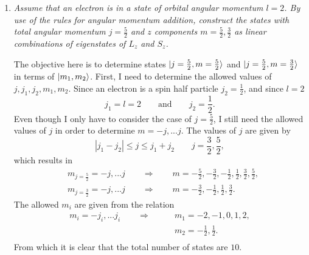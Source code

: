 \begin{example}
	\begin{enumerate}
		\item \emph{Assume that an electron is in a state of orbital angular momentum $l=2$. By use of the rules for angular momentum addition, construct the states with total angular momentum $j=\frac{5}{2}$ and $z$ components $m=\frac{5}{2}, \frac{3}{2}$ as linear combinations of eigenstates of $L_z$ and $S_z$.}\newline
		
		The objective here is to determine states $\ket{j=\frac{5}{2},m=\frac{5}{2}}$ and $\ket{j=\frac{5}{2},m=\frac{3}{2}}$ in terms of $\ket{m_1,m_2}$. First, I need to determine the allowed values of $j,j_1,j_2,m_1,m_2$. Since an electron is a spin half particle $j_2=\frac{1}{2}$, and since $l=2$
		\begin{equation}
			j_1=l=2 \qquad \mbox{and} \qquad j_2=\frac{1}{2}.
		\end{equation} 
		Even though I only have to consider the case of $j=\frac{5}{2}$, I still need the allowed values of $j$ in order to determine $m=-j,...j$. The values of $j$ are given by
		\begin{equation}
			|j_1-j_2|\leq j\leq j_1+j_2 \qquad j=\frac{3}{2}, \frac{5}{2},
		\end{equation} 
		which results in
		\begin{equation}
			\begin{split}
				&m_{j=\frac{5}{2}}=-j,...j \qquad \Rightarrow \qquad m= -\frac{5}{2}, -\frac{3}{2}, -\frac{1}{2}, \frac{1}{2}, \frac{3}{2}, \frac{5}{2},\\
				&m_{j=\frac{3}{2}}=-j,...j \qquad \Rightarrow \qquad m=  -\frac{3}{2}, -\frac{1}{2}, \frac{1}{2}, \frac{3}{2}.
			\end{split}
		\end{equation} 
		The allowed $m_i$ are given from the relation
		\begin{equation}
			\begin{split}
				m_i=-j_i,...j_i \qquad \Rightarrow \qquad &m_1=-2,-1,0,1,2,\\
				&m_2= -\frac{1}{2}, \frac{1}{2}.\\
			\end{split}
		\end{equation} 
		From which it is clear that the total number of states are $10$.
		

\end{enumerate}
\end{example}
